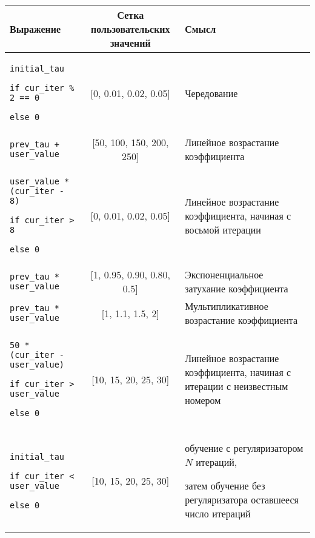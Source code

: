 \begin{table}[]

\small

\begin{tabularx}{\textwidth}{ZcZ}

Выражение                                                      & Сетка пользовательских значений  & Смысл                                                                                       \\ \hline

\texttt{initial\_tau}

\texttt{if cur\_iter \% 2 == 0}

\texttt{else 0}            & [0, 0.01, 0.02, 0.05]            & Чередование                                                                                 \\ \hline

\texttt{prev\_tau + user\_value}                                 & [50, 100, 150, 200, 250]         & Линейное возрастание коэффициента \\ \hline

\texttt{user\_value * (cur\_iter - 8)}

\texttt{if cur\_iter > 8}

\texttt{else 0} & [0, 0.01, 0.02, 0.05]            & Линейное возрастание коэффициента, начиная с восьмой итерации \\ \hline

\texttt{prev\_tau * user\_value}                               & [1, 0.95, 0.90, 0.80, 0.5] & Экспоненциальное затухание коэффициента %

\\ \hline

\texttt{prev\_tau * user\_value}                               & [1, 1.1, 1.5, 2]                 & Мультипликативное возрастание коэффициента    \\ \hline

\texttt{50 * (cur\_iter - user\_value)}

\texttt{if cur\_iter > user\_value}

\texttt{else 0}   & [10, 15, 20, 25, 30]             & Линейное возрастание коэффициента, начиная с итерации с неизвестным номером \\ \hline

\texttt{initial\_tau}

\texttt{if cur\_iter < user\_value}

\texttt{else 0}        & [10, 15, 20, 25, 30]             & обучение с регуляризатором $N$ итераций,

затем обучение без регуляризатора оставшееся число итераций \\ \hline

\end{tabularx}

\label{tab:controller_examples}

\end{table} 

